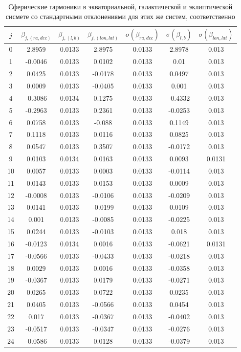 \documentclass[14pt]{article} %
\begin{document}
\newpage
\begin{table}[h!]
\centering
\caption{Сферические гармоники в экваториальной, галактической и эклиптической сисмете со стандартными отклонениями для этих же систем, соответственно}
\label{tabular:sf_all}
\begin{tabular}{|c|c|c|c|c|c|c|}
\hline 	
$j$ &$\beta_{j,(ra,dec)}$ &$\beta_{j,(l,b)}$ &$\beta_{j,(lon,lat)}$ &$\sigma(\beta_{ra,dec})$ &$\sigma(\beta_{l,b})$ & $\sigma(\beta_{lon,lat})$\\
\hline 	
0 &2.8959 &0.0133 &2.8975 &0.0133 &2.8978 &0.013\\
1 &-0.0046 &0.0133 &0.0102 &0.0133 &0.01 &0.013\\
2 &0.0425 &0.0133 &-0.0178 &0.0133 &0.0497 &0.013\\
3 &0.0009 &0.0133 &-0.0405 &0.0133 &0.001 &0.013\\
4 &-0.3086 &0.0134 &0.1275 &0.0133 &-0.4332 &0.013\\
5 &-0.2963 &0.0133 &0.2361 &0.0133 &-0.0253 &0.013\\
6 &0.0758 &0.0133 &-0.088 &0.0133 &0.1149 &0.013\\
7 &0.1118 &0.0133 &0.0116 &0.0133 &0.0825 &0.013\\
8 &0.0547 &0.0133 &0.3507 &0.0133 &-0.0172 &0.013\\
9 &0.0103 &0.0134 &0.0163 &0.0133 &0.0093 &0.0131\\
10 &0.0057 &0.0133 &0.0003 &0.0133 &-0.0114 &0.013\\
11 &0.0143 &0.0133 &0.0153 &0.0133 &0.0009 &0.013\\
12 &-0.0008 &0.0133 &-0.0106 &0.0133 &-0.0209 &0.013\\
13 &0.0141 &0.0133 &-0.0199 &0.0133 &0.0109 &0.013\\
14 &0.001 &0.0133 &-0.0085 &0.0133 &-0.0225 &0.013\\
15 &0.0244 &0.0133 &-0.0103 &0.0133 &0.018 &0.013\\
16 &-0.0123 &0.0134 &0.0016 &0.0133 &-0.0621 &0.0131\\
17 &-0.0566 &0.0133 &-0.0433 &0.0133 &-0.0218 &0.013\\
18 &0.0029 &0.0133 &0.0016 &0.0133 &-0.0358 &0.013\\
19 &-0.0367 &0.0133 &0.0179 &0.0133 &-0.0271 &0.013\\
20 &0.0265 &0.0133 &0.0722 &0.0133 &0.0235 &0.013\\
21 &0.0405 &0.0133 &-0.0566 &0.0133 &0.0454 &0.013\\
22 &0.017 &0.0133 &-0.0367 &0.0133 &-0.0402 &0.013\\
23 &-0.0517 &0.0133 &-0.0347 &0.0133 &-0.0276 &0.013\\
24 &-0.0586 &0.0133 &0.0128 &0.0133 &-0.0379 &0.013\\
\hline 
\end{tabular}
\end{table}
\end{document}
